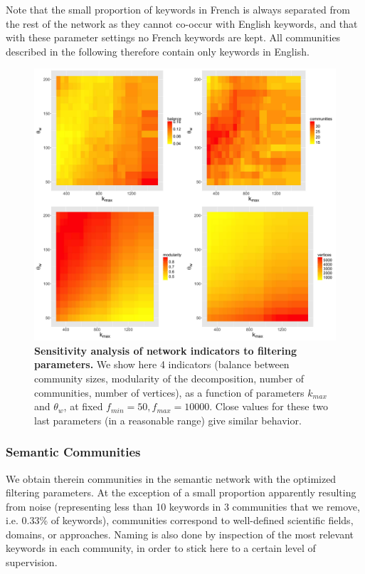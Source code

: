 \documentclass[10pt]{article}
\begin{document}
Note that the small proportion of keywords in French is always separated from the rest of the network as they cannot co-occur with English keywords, and that with these parameter settings no French keywords are kept. All communities described in the following therefore contain only keywords in English.


\begin{figure}
\centering
\includegraphics[width=\linewidth]{Fig6.jpg}
\caption{\textbf{Sensitivity analysis of network indicators to filtering parameters.} We show here 4 indicators (balance between community sizes, modularity of the decomposition, number of communities, number of vertices), as a function of parameters $k_{max}$ and $\theta_w$, at fixed $f_{min} = 50, f_{max} = 10000$. Close values for these two last parameters (in a reasonable range) give similar behavior.}
\label{fig:sensitivity}
\end{figure}





\subsubsection*{Semantic Communities}

We obtain therein communities in the semantic network with the optimized filtering parameters. At the exception of a small proportion apparently resulting from noise (representing less than 10 keywords in 3 communities that we remove, i.e. 0.33\% of keywords), communities correspond to well-defined scientific fields, domains, or approaches. Naming is also done by inspection of the most relevant keywords in each community, in order to stick here to a certain level of supervision.
\end{document}
